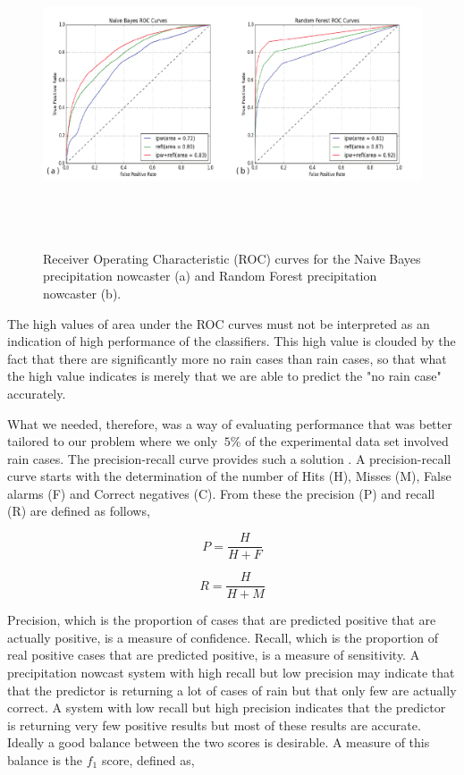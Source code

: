 \documentclass[proposal]{umassthesis}
\begin{document}
{\begin{figure}[!t]
\begin{center}
\includegraphics[width = 15cm,height = 9cm]{RF_NB_ROC}
\caption{Receiver Operating Characteristic (ROC) curves for the Naive Bayes precipitation nowcaster (a) and Random Forest precipitation nowcaster (b).}\label{fig:ROC_Curves}
\end{center}
\end{figure}

The high values of area under the ROC curves must not be interpreted as an indication of high performance of the classifiers. This high value is clouded by the fact that there are significantly more no rain cases than rain cases, so that what the high value indicates is merely that we are able to predict the "no rain case" accurately.

What we needed, therefore, was a way of evaluating performance that was better tailored to our problem where we only $~5 \%$ of the experimental data set involved rain cases. The precision-recall curve provides such a solution \cite{powers2011evaluation}. A precision-recall curve starts with the determination of the number of Hits (H), Misses (M), False alarms (F) and Correct negatives (C). From these the precision (P) and recall (R) are defined as follows,
 
\begin{equation}
P = \dfrac{H}{H + F}
\end{equation}

\begin{equation}
R = \dfrac{H}{H + M}
\end{equation}
 
Precision, which is the proportion of cases that are predicted positive that are actually positive, is a measure of confidence. Recall, which is the proportion of real positive cases that are predicted positive, is a measure of sensitivity. A precipitation nowcast system with high recall but low precision may indicate that that the predictor is returning a lot of cases of rain but that only few are actually correct. A system with low recall but high precision indicates that the predictor is returning very few positive results but most of these results are accurate. Ideally a good balance between the two scores is desirable. A measure of this balance is the $f_1$ score, defined as,

}
\end{document}
